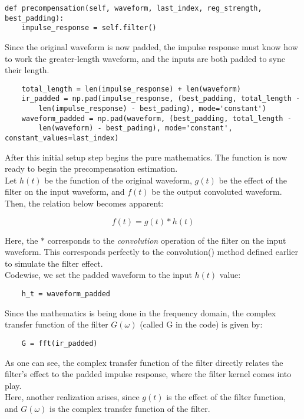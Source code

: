 \documentclass[11pt, a4paper]{article}
\theoremstyle{definition}
\numberwithin{equation}{section}
\begin{document}
\begin{verbatim}
def precompensation(self, waveform, last_index, reg_strength, best_padding):
    impulse_response = self.filter()
\end{verbatim}

Since the original waveform is now padded, the impulse response must know how to work the greater-length waveform, and the inputs are both padded to sync their length. 

\begin{verbatim}
    total_length = len(impulse_response) + len(waveform)
    ir_padded = np.pad(impulse_response, (best_padding, total_length - 
        len(impulse_response) - best_pading), mode='constant')
    waveform_padded = np.pad(waveform, (best_padding, total_length - 
        len(waveform) - best_pading), mode='constant', constant_values=last_index)
\end{verbatim}

After this initial setup step begins the pure mathematics. The function is now ready to begin the precompensation estimation.
\\
Let $h(t)$ be the function of the original waveform, $g(t)$ be the effect of the filter on the input waveform, and $f(t)$ be the output convoluted waveform. Then, the relation below becomes apparent:

\begin{equation}
    f(t) = g(t) * h(t)
\end{equation}

Here, the $*$ corresponds to the \textit{convolution} operation of the filter on the input waveform. This corresponds perfectly to the convolution() method defined earlier to simulate the filter effect.
\\
Codewise, we set the padded waveform to the input $h(t)$ value:

\begin{verbatim}
    h_t = waveform_padded
\end{verbatim}

Since the mathematics is being done in the frequency domain, the complex transfer function of the filter $G(\omega)$ (called G in the code) is given by: 

\begin{verbatim}
    G = fft(ir_padded)
\end{verbatim}

As one can see, the complex transfer function of the filter directly relates the filter's effect to the padded impulse response, where the filter kernel comes into play. 
\\
Here, another realization arises, since $g(t)$ is the effect of the filter function, and $G(\omega)$ is the complex transfer function of the filter.
\end{document}
